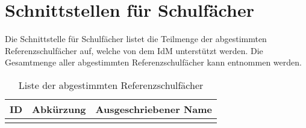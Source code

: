 \section{Schnittstellen für Schulfächer}
Die Schnittstelle für Schulfächer listet die Teilmenge der abgestimmten Referenzschulfächer auf, welche von dem IdM unterstützt werden.
Die Gesamtmenge aller abgestimmten Referenzschulfächer kann  entnommen werden.

\begin{longtable}{|p{}|p{}|p{}|}
\caption{Liste der abgestimmten Referenzschulfächer}
\endfoot
\caption{Liste der abgestimmten Referenzschulfächer}
		\label{tab:rest:api:school-subjects:list}
\endlastfoot 
\hline
\textbf{ID} & \textbf{Abkürzung} & \textbf{Ausgeschriebener Name} \\ \hline
\endhead
 & &  \\ \hline
	\end{longtable}


%

%
%